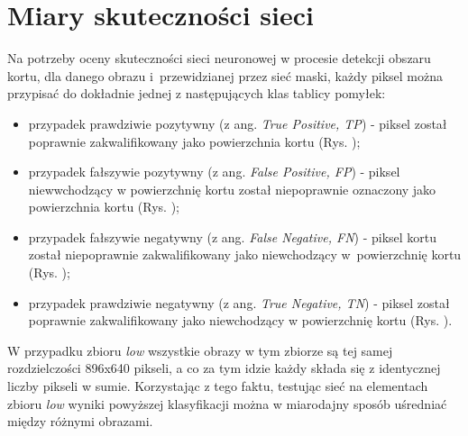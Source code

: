 \section{Miary skuteczności sieci}

Na potrzeby oceny skuteczności sieci neuronowej w procesie detekcji obszaru kortu, dla danego obrazu i~przewidzianej przez sieć maski, każdy piksel można przypisać do dokładnie jednej z następujących klas tablicy pomyłek:

\begin{itemize}
  \item przypadek prawdziwie pozytywny (z ang. \textit{True Positive, TP}) - piksel został poprawnie zakwalifikowany jako powierzchnia kortu (Rys. );
  \item przypadek fałszywie pozytywny (z ang. \textit{False Positive, FP}) - piksel niewwchodzący w powierzchnię kortu został niepoprawnie oznaczony jako powierzchnia kortu (Rys. );
  \item przypadek fałszywie negatywny (z ang. \textit{False Negative, FN}) - piksel kortu został niepoprawnie zakwalifikowany jako niewchodzący w~powierzchnię kortu (Rys. );
  \item przypadek prawdziwie negatywny (z ang. \textit{True Negative, TN}) - piksel został poprawnie zakwalifikowany jako niewchodzący w powierzchnię kortu (Rys. ).
\end{itemize}

W przypadku zbioru \textit{low} wszystkie obrazy w tym zbiorze są tej samej rozdzielczości 896x640 pikseli, a co za tym idzie każdy składa się z identycznej liczby pikseli w sumie.
Korzystając z tego faktu, testując sieć na elementach zbioru \textit{low} wyniki powyższej klasyfikacji można w miarodajny sposób uśredniać między różnymi obrazami.


